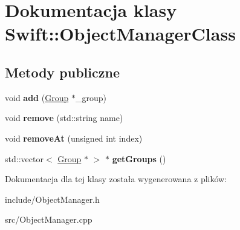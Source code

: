 \hypertarget{class_swift_1_1_object_manager_class}{\section{Dokumentacja klasy Swift\-:\-:Object\-Manager\-Class}
\label{class_swift_1_1_object_manager_class}
}
\subsection*{Metody publiczne}
\begin{DoxyCompactItemize}
\item 
\hypertarget{class_swift_1_1_object_manager_class_a613685184bf09809d44a698850d4aa61}{void {\bfseries add} (\hyperlink{class_swift_1_1_group}{Group} $\ast$\-\_\-group)}\label{class_swift_1_1_object_manager_class_a613685184bf09809d44a698850d4aa61}

\item 
\hypertarget{class_swift_1_1_object_manager_class_a10ef742475be3476a93866d7fe32427d}{void {\bfseries remove} (std\-::string name)}\label{class_swift_1_1_object_manager_class_a10ef742475be3476a93866d7fe32427d}

\item 
\hypertarget{class_swift_1_1_object_manager_class_ad418717cc92d60410da844555c4c0268}{void {\bfseries remove\-At} (unsigned int index)}\label{class_swift_1_1_object_manager_class_ad418717cc92d60410da844555c4c0268}

\item 
\hypertarget{class_swift_1_1_object_manager_class_ac906673364d5d11003d2f2a4b4e35ae0}{std\-::vector$<$ \hyperlink{class_swift_1_1_group}{Group} $\ast$ $>$ $\ast$ {\bfseries get\-Groups} ()}\label{class_swift_1_1_object_manager_class_ac906673364d5d11003d2f2a4b4e35ae0}

\end{DoxyCompactItemize}


Dokumentacja dla tej klasy została wygenerowana z plików\-:\begin{DoxyCompactItemize}
\item 
include/Object\-Manager.\-h\item 
src/Object\-Manager.\-cpp\end{DoxyCompactItemize}

